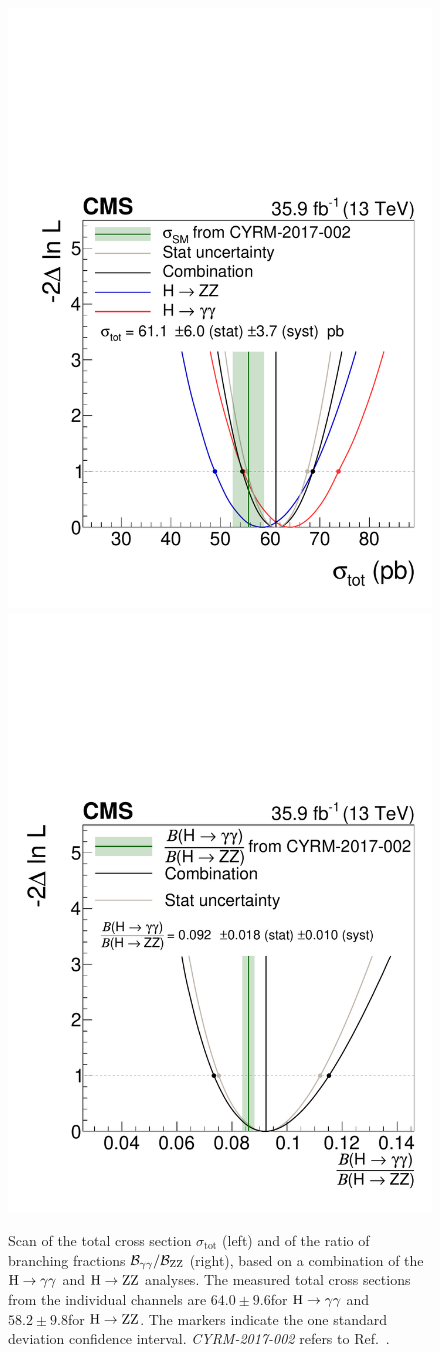 \begin{figure}[hbtp]
  \begin{center}
    \includegraphics[width=0.49\linewidth]{img/differentials/scans_totalXS.pdf}
    \includegraphics[width=0.49\linewidth]{img/differentials/scans_ratioOfBRs.pdf}
    \caption{
        Scan of the total cross section $\sigma_\text{tot}$ (left) and of the ratio of branching fractions $\mathcal{B}_{\mathrm{\gamma}\mathrm{\gamma}}/\mathcal{B}_{\mathrm{Z}\mathrm{Z}}$ (right), based on a combination of the $\mathrm{H}\to\mathrm{\gamma}\mathrm{\gamma}$ and $\mathrm{H}\to\mathrm{Z}\mathrm{Z}$ analyses.
        The measured total cross sections from the individual channels are $64.0\pm9.6$\pb for $\mathrm{H}\to\mathrm{\gamma}\mathrm{\gamma}$ and $58.2\pm9.8$\pb for $\mathrm{H}\to\mathrm{Z}\mathrm{Z}$.
        The markers indicate the one standard deviation confidence interval.
        \textit{CYRM-2017-002} refers to Ref.~\cite{deFlorian:2016spz}.
        }
    \label{fig:RatioOfbrsAndTotalXSscan}
  \end{center}
\end{figure}


